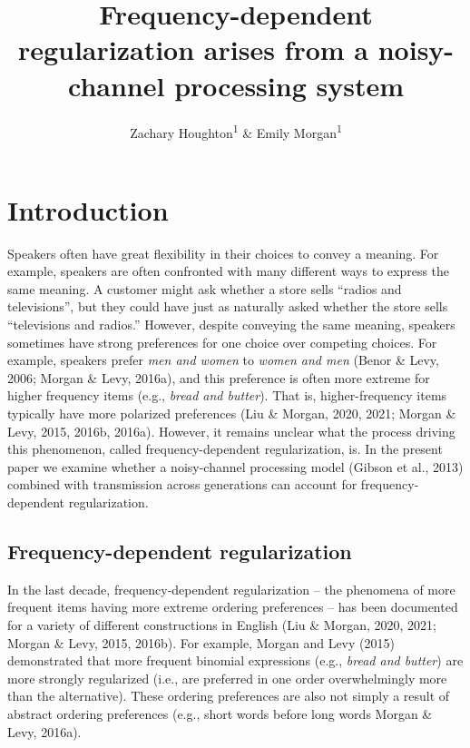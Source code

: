 \documentclass[
  jou,floatsintext]{apa6}
\title{Frequency-dependent regularization arises from a noisy-channel processing system}
\author{Zachary Houghton\textsuperscript{1} \& Emily Morgan\textsuperscript{1}}
\date{}
\affiliation{\vspace{0.5cm}\textsuperscript{1} University of California, Davis}
\begin{document}
\maketitle

\section{Introduction}\label{introduction}

Speakers often have great flexibility in their choices to convey a meaning. For example, speakers are often confronted with many different ways to express the same meaning. A customer might ask whether a store sells ``radios and televisions'', but they could have just as naturally asked whether the store sells ``televisions and radios.'' However, despite conveying the same meaning, speakers sometimes have strong preferences for one choice over competing choices. For example, speakers prefer \emph{men and women} to \emph{women and men} (Benor \& Levy, 2006; Morgan \& Levy, 2016a), and this preference is often more extreme for higher frequency items (e.g., \emph{bread and butter}). That is, higher-frequency items typically have more polarized preferences (Liu \& Morgan, 2020, 2021; Morgan \& Levy, 2015, 2016b, 2016a). However, it remains unclear what the process driving this phenomenon, called frequency-dependent regularization, is. In the present paper we examine whether a noisy-channel processing model (Gibson et al., 2013) combined with transmission across generations can account for frequency-dependent regularization.

\subsection{Frequency-dependent regularization}\label{frequency-dependent-regularization}

In the last decade, frequency-dependent regularization -- the phenomena of more frequent items having more extreme ordering preferences -- has been documented for a variety of different constructions in English (Liu \& Morgan, 2020, 2021; Morgan \& Levy, 2015, 2016b). For example, Morgan and Levy (2015) demonstrated that more frequent binomial expressions (e.g., \emph{bread and butter}) are more strongly regularized (i.e., are preferred in one order overwhelmingly more than the alternative). These ordering preferences are also not simply a result of abstract ordering preferences (e.g., short words before long words Morgan \& Levy, 2016a).
\end{document}
